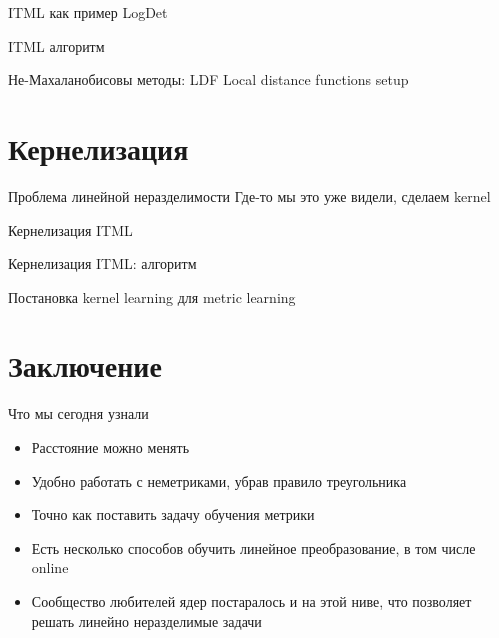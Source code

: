 \documentclass[14pt, fleqn, xcolor={dvipsnames, table}]{beamer}
\begin{document}
\begin{frame}{ITML как пример LogDet}
\end{frame}

\begin{frame}{ITML алгоритм}
\end{frame}

\begin{frame}{Не-Махаланобисовы методы: LDF}
Local distance functions setup
\end{frame}

\section{Кернелизация}
\begin{frame}{Проблема линейной неразделимости}
Где-то мы это уже видели, сделаем kernel
\end{frame}

\begin{frame}{Кернелизация ITML}
\end{frame}

\begin{frame}{Кернелизация ITML: алгоритм}
\end{frame}

\begin{frame}{Постановка kernel learning для metric learning}
\end{frame}

\section{Заключение}
\begin{frame}{Что мы сегодня узнали}
\begin{itemize}
  \item Расстояние можно менять
  \item Удобно работать с неметриками, убрав правило треугольника
  \item Точно как поставить задачу обучения метрики
  \item Есть несколько способов обучить линейное преобразование, в том числе online
  \item Сообщество любителей ядер постаралось и на этой ниве, что позволяет решать линейно неразделимые задачи
\end{itemize}
\end{frame}
\end{document}

